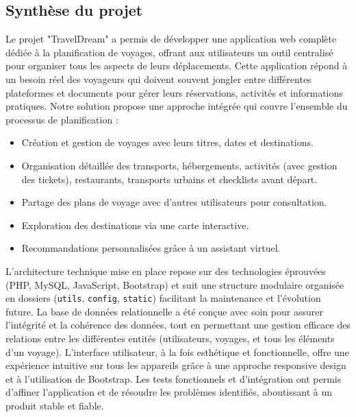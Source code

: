 \documentclass[a4paper,12pt]{article}
\begin{document}
\subsection{Synthèse du projet}
Le projet "TravelDream" a permis de développer une application web complète dédiée à la planification de voyages, offrant aux utilisateurs un outil centralisé pour organiser tous les aspects de leurs déplacements. Cette application répond à un besoin réel des voyageurs qui doivent souvent jongler entre différentes plateformes et documents pour gérer leurs réservations, activités et informations pratiques.
Notre solution propose une approche intégrée qui couvre l'ensemble du processus de planification :
\begin{itemize}
    \item Création et gestion de voyages avec leurs titres, dates et destinations.
    \item Organisation détaillée des transports, hébergements, activités (avec gestion des tickets), restaurants, transports urbains et checklists avant départ.
    \item Partage des plans de voyage avec d'autres utilisateurs pour consultation.
    \item Exploration des destinations via une carte interactive.
    \item Recommandations personnalisées grâce à un assistant virtuel.
\end{itemize}
L'architecture technique mise en place repose sur des technologies éprouvées (PHP, MySQL, JavaScript, Bootstrap) et suit une structure modulaire organisée en dossiers (\texttt{utils}, \texttt{config}, \texttt{static}) facilitant la maintenance et l'évolution future. La base de données relationnelle a été conçue avec soin pour assurer l'intégrité et la cohérence des données, tout en permettant une gestion efficace des relations entre les différentes entités (utilisateurs, voyages, et tous les éléments d'un voyage).
L'interface utilisateur, à la fois esthétique et fonctionnelle, offre une expérience intuitive sur tous les appareils grâce à une approche responsive design et à l'utilisation de Bootstrap. Les tests fonctionnels et d'intégration ont permis d'affiner l'application et de résoudre les problèmes identifiés, aboutissant à un produit stable et fiable.
\end{document}
